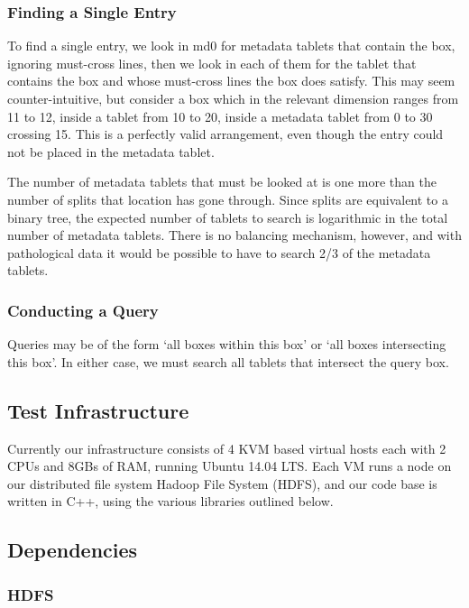 \documentclass[11pt]{article}
\begin{document}
\subsubsection{Finding a Single Entry}

To find a single entry, we look in md0 for metadata tablets that contain the box, ignoring must-cross lines, then we look in each of them for the tablet that contains the box and whose must-cross lines the box does satisfy. This may seem counter-intuitive, but consider a box which in the relevant dimension ranges from 11 to 12, inside a tablet from 10 to 20, inside a metadata tablet from 0 to 30 crossing 15. This is a perfectly valid arrangement, even though the entry could not be placed in the metadata tablet.

The number of metadata tablets that must be looked at is one more than the number of splits that location has gone through. Since splits are equivalent to a binary tree, the expected number of tablets to search is logarithmic in the total number of metadata tablets. There is no balancing mechanism, however, and with pathological data it would be possible to have to search 2/3 of the metadata tablets.

\subsubsection{Conducting a Query}

Queries may be of the form `all boxes within this box' or `all boxes intersecting this box'. In either case, we must search all tablets that intersect the query box. 

\subsection{Test Infrastructure}

Currently our infrastructure consists of 4 KVM based virtual hosts each with 2 CPUs and 8GBs of RAM, running Ubuntu 14.04 LTS. Each VM runs a node on our distributed file system Hadoop File System (HDFS), and our code base is written in C++, using the various libraries outlined below.

\subsection{Dependencies}

\subsubsection{HDFS}
\end{document}
